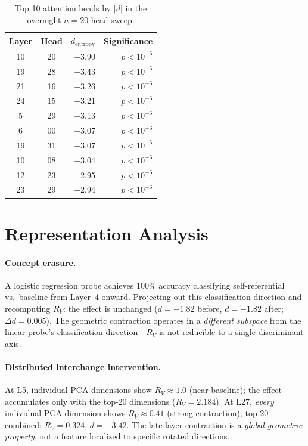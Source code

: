 \documentclass{article}
\newcommand{\RV}{R_V}
\newcommand{\dcohen}{d}
\begin{document}
\begin{table}[h]
\centering
\caption{Top 10 attention heads by $|\dcohen|$ in the overnight $n = 20$ head sweep.}
\small
\begin{tabular}{ccrr}
\toprule
Layer & Head & $\dcohen_\mathrm{entropy}$ & Significance \\
\midrule
10 & 20 & $+$3.90 & $p < 10^{-6}$ \\
19 & 28 & $+$3.43 & $p < 10^{-6}$ \\
21 & 16 & $+$3.26 & $p < 10^{-6}$ \\
24 & 15 & $+$3.21 & $p < 10^{-6}$ \\
5 & 29 & $+$3.13 & $p < 10^{-6}$ \\
6 & 00 & $-$3.07 & $p < 10^{-6}$ \\
19 & 31 & $+$3.07 & $p < 10^{-6}$ \\
10 & 08 & $+$3.04 & $p < 10^{-6}$ \\
12 & 23 & $+$2.95 & $p < 10^{-6}$ \\
23 & 29 & $-$2.94 & $p < 10^{-6}$ \\
\bottomrule
\end{tabular}
\end{table}


\section{Representation Analysis}
\label{app:representation}

\paragraph{Concept erasure.}
A logistic regression probe achieves 100\% accuracy classifying self-referential vs.\ baseline
from Layer~4 onward.
Projecting out this classification direction and recomputing $\RV$: the effect is unchanged
($\dcohen = -1.82$ before, $\dcohen = -1.82$ after; $\Delta d = 0.005$).
The geometric contraction operates in a \emph{different subspace} from the linear probe's
classification direction---$\RV$ is not reducible to a single discriminant axis.

\paragraph{Distributed interchange intervention.}
At L5, individual PCA dimensions show $\RV \approx 1.0$ (near baseline); the effect accumulates
only with the top-20 dimensions ($\RV = 2.184$).
At L27, \emph{every} individual PCA dimension shows $\RV \approx 0.41$ (strong contraction);
top-20 combined: $\RV = 0.324$, $\dcohen = -3.42$.
The late-layer contraction is a \emph{global geometric property}, not a feature localized
to specific rotated directions.
\end{document}
